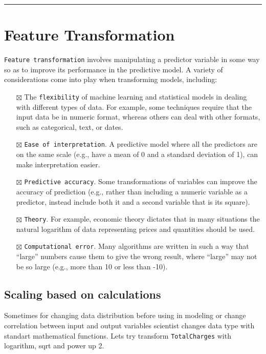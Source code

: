 \documentclass[
  letterpaper,
  DIV=11,
  numbers=noendperiod]{scrreprt}
\providecommand{\tightlist}{%
  \setlength{\itemsep}{0pt}\setlength{\parskip}{0pt}}\usepackage{longtable,booktabs,array}
\begin{document}
\begin{center}\rule{0.5\linewidth}{0.5pt}\end{center}

\section{Feature Transformation}\label{feature-transformation}

\texttt{Feature\ transformation} involves manipulating a predictor
variable in some way so as to improve its performance in the predictive
model. A variety of considerations come into play when transforming
models, including:

\begin{itemize}
\tightlist
\item[$\boxtimes$]
  The \texttt{flexibility} of machine learning and statistical models in
  dealing with different types of data. For example, some techniques
  require that the input data be in numeric format, whereas others can
  deal with other formats, such as categorical, text, or dates.
\item[$\boxtimes$]
  \texttt{Ease\ of\ interpretation}. A predictive model where all the
  predictors are on the same scale (e.g., have a mean of 0 and a
  standard deviation of 1), can make interpretation easier.
\item[$\boxtimes$]
  \texttt{Predictive\ accuracy}. Some transformations of variables can
  improve the accuracy of prediction (e.g., rather than including a
  numeric variable as a predictor, instead include both it and a second
  variable that is its square).
\item[$\boxtimes$]
  \texttt{Theory}. For example, economic theory dictates that in many
  situations the natural logarithm of data representing prices and
  quantities should be used.
\item[$\boxtimes$]
  \texttt{Computational\ error}. Many algorithms are written in such a
  way that ``large'' numbers cause them to give the wrong result, where
  ``large'' may not be so large (e.g., more than 10 or less than -10).
\end{itemize}

\subsection{Scaling based on
calculations}\label{scaling-based-on-calculations}

Sometimes for changing data distribution before using in modeling or
change correlation between input and output variables scientist changes
data type with standart mathematical functions. Lets try transform
\texttt{TotalCharges} with logarithm, sqrt and power up 2.
\end{document}
